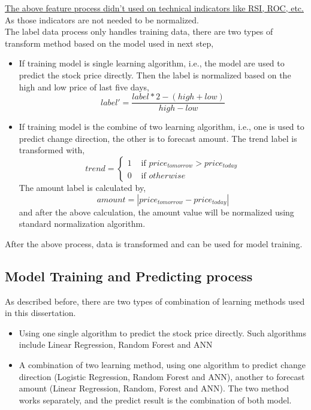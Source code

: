 \underline{The above feature process didn't used on technical indicators like RSI, ROC, etc.} As those indicators are not needed to be normalized.\\


The label data process only handles training data, there are two types of transform method based on the model used in next step,
\begin{itemize}
	\item If training model is single learning algorithm, i.e., the model are used to predict the stock price directly. Then the label is normalized based on the high and low price of last five days,
	\begin{equation}
	label'=\frac{label*2-(high + low)}{high - low}
	\end{equation}
	\item If training model is the combine of two learning algorithm, i.e., one is used to predict change direction, the other is to forecast amount. The trend label is transformed with,
	\begin{equation}
	trend=\begin{cases}
	1 & \text{ if } price_{tomorrow} > price_{today} \\ 
	0 & \text{ if } otherwise
	\end{cases}
	\end{equation}
	The amount label is calculated by,
	\begin{equation}
	amount=\left | price_{tomorrow} - price_{today} \right |
	\end{equation}
	and after the above calculation, the amount value will be normalized using standard normalization algorithm. 
\end{itemize}

After the above process, data is transformed and can be used for model training.

\subsection{Model Training and Predicting process}
As described before, there are two types of combination of learning methods used in this dissertation. 


\begin{itemize}
	\item Using one single algorithm to predict the stock price directly. Such algorithms include Linear Regression, Random Forest and ANN
	\item A combination of two learning method, using one algorithm to predict change direction (Logistic Regression, Random Forest and ANN), another to forecast amount (Linear Regression, Random, Forest and ANN). The two method works separately, and the predict result is the combination of both model.
\end{itemize}

